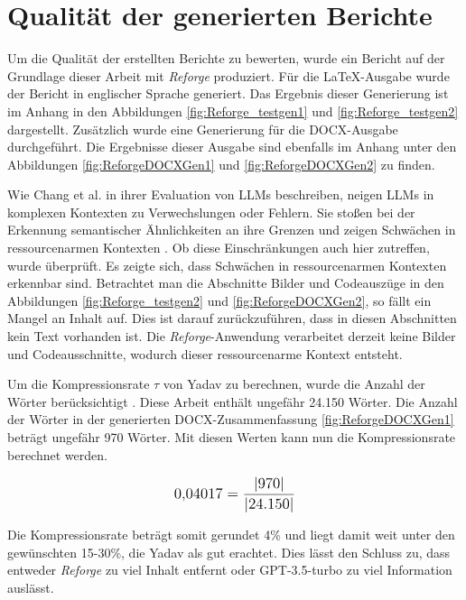\section{Qualität der generierten Berichte}

Um die Qualität der erstellten Berichte zu bewerten, wurde ein Bericht auf der Grundlage dieser Arbeit mit \textit{Reforge} produziert. Für die LaTeX-Ausgabe wurde der Bericht in englischer Sprache generiert. Das Ergebnis dieser Generierung ist im Anhang in den Abbildungen \ref{fig:Reforge_testgen1} und \ref{fig:Reforge_testgen2} dargestellt. Zusätzlich wurde eine Generierung für die \ac{DOCX}-Ausgabe durchgeführt. Die Ergebnisse dieser Ausgabe sind ebenfalls im Anhang unter den Abbildungen \ref{fig:ReforgeDOCXGen1} und \ref{fig:ReforgeDOCXGen2} zu finden.

Wie Chang et al. in ihrer Evaluation von \ac{LLM}s beschreiben, neigen \ac{LLM}s in komplexen Kontexten zu Verwechslungen oder Fehlern. Sie stoßen bei der Erkennung semantischer Ähnlichkeiten an ihre Grenzen und zeigen Schwächen in ressourcenarmen Kontexten \cite{10.1145/3641289}. Ob diese Einschränkungen auch hier zutreffen, wurde überprüft. Es zeigte sich, dass Schwächen in ressourcenarmen Kontexten erkennbar sind. Betrachtet man die Abschnitte Bilder und Codeauszüge in den Abbildungen \ref{fig:Reforge_testgen2} und \ref{fig:ReforgeDOCXGen2}, so fällt ein Mangel an Inhalt auf. Dies ist darauf zurückzuführen, dass in diesen Abschnitten kein Text vorhanden ist. Die \textit{Reforge}-Anwendung verarbeitet derzeit keine Bilder und Codeausschnitte, wodurch dieser ressourcenarme Kontext entsteht.

Um die Kompressionsrate $\tau$ von Yadav zu berechnen, wurde die Anzahl der Wörter berücksichtigt \cite{yadav2022automatictextsummarizationmethods}. Diese Arbeit enthält ungefähr 24.150 Wörter. Die Anzahl der Wörter in der generierten \ac{DOCX}-Zusammenfassung \ref{fig:ReforgeDOCXGen1} beträgt ungefähr 970 Wörter. Mit diesen Werten kann nun die Kompressionsrate berechnet werden.

\begin{align}
\mathlarger{\text{0,04017} = \frac{| \text{970} |}{| \text{24.150} |}}
\end{align}

Die Kompressionsrate beträgt somit gerundet 4\% und liegt damit weit unter den gewünschten 15-30\%, die Yadav als gut erachtet. Dies lässt den Schluss zu, dass entweder \textit{Reforge} zu viel Inhalt entfernt oder \ac{GPT}-3.5-turbo zu viel Information auslässt.

